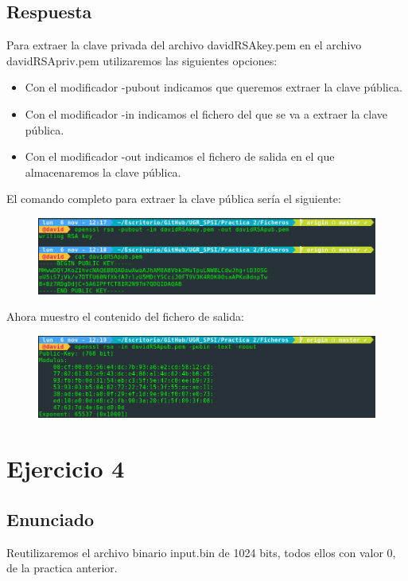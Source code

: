 \documentclass[10pt,a4paper,spanish]{report}
\begin{document}
\section{Respuesta}
\noindent
Para extraer la clave privada del archivo davidRSAkey.pem en el archivo davidRSApriv.pem utilizaremos las siguientes opciones:

\begin{itemize}
 \item Con el modificador -pubout indicamos que queremos extraer la clave pública.
 \item Con el modificador -in indicamos el fichero del que se va a extraer la clave pública.
 \item Con el modificador -out indicamos el fichero de salida en el que almacenaremos la clave pública.
\end{itemize}

\noindent
El comando completo para extraer la clave pública sería el siguiente:

\begin{figure}[!hbp]
 \centering  \includegraphics[width=1\textwidth]{./Imagenes/3_0.png}
\end{figure}

\noindent
Ahora muestro el contenido del fichero de salida:

\begin{figure}[!hbp]
 \centering  \includegraphics[width=1\textwidth]{./Imagenes/3_1.png}
\end{figure}


\chapter{Ejercicio 4}

\section{Enunciado}
\noindent
Reutilizaremos el archivo binario input.bin de 1024 bits, todos ellos con valor 0, de la practica anterior.
\end{document}
